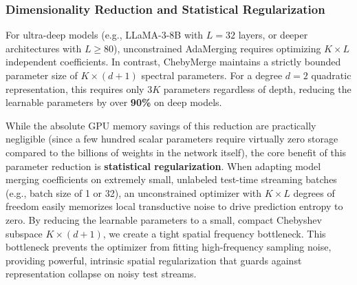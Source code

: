 \documentclass{article}
\theoremstyle{plain}
\theoremstyle{definition}
\theoremstyle{remark}
\begin{document}
\subsubsection{Dimensionality Reduction and Statistical Regularization}
For ultra-deep models (e.g., LLaMA-3-8B with $L=32$ layers, or deeper architectures with $L \ge 80$), unconstrained AdaMerging requires optimizing $K \times L$ independent coefficients. In contrast, ChebyMerge maintains a strictly bounded parameter size of $K \times (d+1)$ spectral parameters. For a degree $d=2$ quadratic representation, this requires only $3K$ parameters regardless of depth, reducing the learnable parameters by over \textbf{90\%} on deep models.

While the absolute GPU memory savings of this reduction are practically negligible (since a few hundred scalar parameters require virtually zero storage compared to the billions of weights in the network itself), the core benefit of this parameter reduction is \textbf{statistical regularization}. When adapting model merging coefficients on extremely small, unlabeled test-time streaming batches (e.g., batch size of 1 or 32), an unconstrained optimizer with $K \times L$ degrees of freedom easily memorizes local transductive noise to drive prediction entropy to zero. By reducing the learnable parameters to a small, compact Chebyshev subspace $K \times (d+1)$, we create a tight spatial frequency bottleneck. This bottleneck prevents the optimizer from fitting high-frequency sampling noise, providing powerful, intrinsic spatial regularization that guards against representation collapse on noisy test streams.
\end{document}
